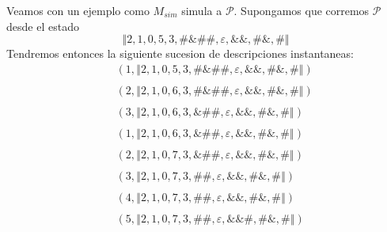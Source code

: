 \begin{frame}
  Veamos con un ejemplo como $M_{sim}$ simula a $\mathcal{P}$. Supongamos que
  corremos $\mathcal{P}$ desde el estado%
  \begin{equation*}
  \left\Vert 2,1,0,5,3,\#\&\#\#,\varepsilon ,\&\&,\#\&,\#\right\Vert
  \end{equation*}%
  Tendremos entonces la siguiente sucesion de descripciones instantaneas:%
  \begin{eqnarray*}
  &&(1,\left\Vert 2,1,0,5,3,\#\&\#\#,\varepsilon ,\&\&,\#\&,\#\right\Vert ) \\
  && \\
  &&(2,\left\Vert 2,1,0,6,3,\#\&\#\#,\varepsilon ,\&\&,\#\&,\#\right\Vert ) \\
  && \\
  &&(3,\left\Vert 2,1,0,6,3,\&\#\#,\varepsilon ,\&\&,\#\&,\#\right\Vert ) \\
  && \\
  &&(1,\left\Vert 2,1,0,6,3,\&\#\#,\varepsilon ,\&\&,\#\&,\#\right\Vert ) \\
  && \\
  &&(2,\left\Vert 2,1,0,7,3,\&\#\#,\varepsilon ,\&\&,\#\&,\#\right\Vert ) \\
  && \\
  &&(3,\left\Vert 2,1,0,7,3,\#\#,\varepsilon ,\&\&,\#\&,\#\right\Vert ) \\
  && \\
  &&(4,\left\Vert 2,1,0,7,3,\#\#,\varepsilon ,\&\&,\#\&,\#\right\Vert ) \\
  && \\
  &&(5,\left\Vert 2,1,0,7,3,\#\#,\varepsilon ,\&\&\#,\#\&,\#\right\Vert )
  \end{eqnarray*}

\end{frame}
